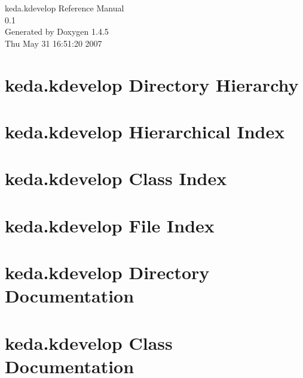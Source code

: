 \documentclass[a4paper]{book}
\begin{document}
\begin{titlepage}
\vspace*{7cm}
\begin{center}
{\Large keda.kdevelop Reference Manual\\[1ex]\large 0.1 }\\
\vspace*{1cm}
{\large Generated by Doxygen 1.4.5}\\
\vspace*{0.5cm}
{\small Thu May 31 16:51:20 2007}\\
\end{center}
\end{titlepage}
\clearemptydoublepage
{}
\tableofcontents
\clearemptydoublepage
{}
\chapter{keda.kdevelop Directory Hierarchy}

\chapter{keda.kdevelop Hierarchical Index}

\chapter{keda.kdevelop Class Index}

\chapter{keda.kdevelop File Index}

\chapter{keda.kdevelop Directory Documentation}



\chapter{keda.kdevelop Class Documentation}





















\end{document}
